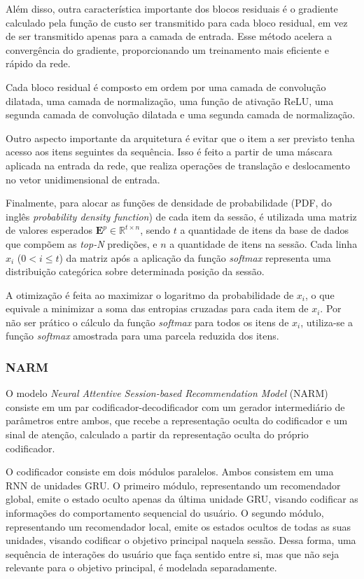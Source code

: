 Além disso, outra característica importante dos blocos residuais é o gradiente
calculado pela função de custo ser transmitido para cada bloco residual, em vez
de ser transmitido apenas para a camada de entrada. Esse método acelera a
convergência do gradiente, proporcionando um treinamento mais eficiente e rápido
da rede.

Cada bloco residual é composto em ordem por uma camada de convolução dilatada,
uma camada de normalização, uma função de ativação ReLU, uma segunda camada de
convolução dilatada e uma segunda camada de normalização.

Outro aspecto importante da arquitetura é evitar que o item a ser previsto tenha
acesso aos itens seguintes da sequência. Isso é feito a partir de uma máscara
aplicada na entrada da rede, que realiza operações de translação e deslocamento
no vetor unidimensional de entrada.

Finalmente, para alocar as funções de densidade de probabilidade (PDF, do inglês
\textit{probability density function}) de cada item da sessão, é utilizada uma
matriz de valores esperados $\mathbf{E}^{p} \in \mathbb{R}^{t \times n}$, sendo
$t$ a quantidade de itens da base de dados que compõem as \textit{top-N}
predições, e $n$ a quantidade de itens na sessão. Cada linha $x_i$ ($0 < i \leq
t$) da matriz após a aplicação da função \textit{softmax} representa uma
distribuição categórica sobre determinada posição da sessão.

A otimização é feita ao maximizar o logaritmo da probabilidade de $x_i$, o que
equivale a minimizar a soma das entropias cruzadas para cada item de $x_i$. Por
não ser prático o cálculo da função \textit{softmax} para todos os itens de
$x_i$, utiliza-se a função \textit{softmax} amostrada para uma parcela reduzida
dos itens.

\subsubsection{NARM}
O modelo \textit{Neural Attentive Session-based Recommendation Model} (NARM)
\cite{narm} consiste em um par codificador-decodificador com um gerador
intermediário de parâmetros entre ambos, que recebe a representação oculta do
codificador e um sinal de atenção, calculado a partir da representação oculta do
próprio codificador.

O codificador consiste em dois módulos paralelos. Ambos consistem em uma RNN de
unidades GRU. O primeiro módulo, representando um recomendador global, emite o
estado oculto apenas da última unidade GRU, visando codificar as informações do
comportamento sequencial do usuário. O segundo módulo, representando um
recomendador local, emite os estados ocultos de todas as suas unidades, visando
codificar o objetivo principal naquela sessão. Dessa forma, uma sequência de
interações do usuário que faça sentido entre si, mas que não seja relevante para
o objetivo principal, é modelada separadamente.


